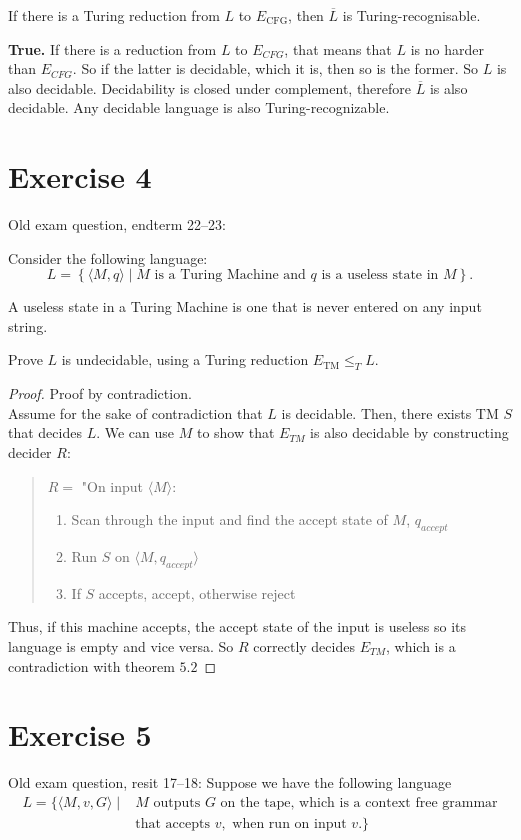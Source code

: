 \documentclass[a4paper,11pt]{article}
\newcommand{\set}[1]{\left\{ #1 \right\}}
\begin{document}
	If there is a Turing reduction from $L$ to $E_{\mathrm{CFG}}$, then $\overline{L}$ is Turing-recognisable.

	\textbf{True.} If there is a reduction from $L$ to $E_{CFG}$, that means that $L$ is no harder than $E_{CFG}$. So if the latter is decidable, which it is, then so is the former. So $L$ is also decidable. Decidability is closed under complement, therefore $\overline{L}$ is also decidable. Any decidable language is also Turing-recognizable.

	\section{Exercise 4}
	Old exam question, endterm 22--23:

	Consider the following language:
	\[
	L = \set{\langle M,q \rangle \mid M \text{ is a Turing Machine and } q \text{ is a useless state in } M }.
	\]

	A useless state in a Turing Machine is one that is never entered on any input string.

	Prove $L$ is undecidable, using a Turing reduction $E_{\mathrm{TM}} \leq_T L$.

	\begin{proof}
		Proof by contradiction.\\
		Assume for the sake of contradiction that $L$ is decidable. Then, there exists TM $S$ that decides $L$. We can use $M$ to show that $E_{TM}$ is also decidable by constructing decider $R$:
		\begin{quote}
			$R=$ "On input $\langle M\rangle$:
			\begin{enumerate}
				\item Scan through the input and find the accept state of $M$, $q_{accept}$
				\item Run $S$ on $\langle M,q_{accept}\rangle$
				\item If $S$ accepts, accept, otherwise reject
			\end{enumerate}
		\end{quote}
		Thus, if this machine accepts, the accept state of the input is useless so its language is empty and vice versa. So $R$ correctly decides $E_{TM}$, which is a contradiction with theorem $5.2$
	\end{proof}

	\section{Exercise 5}
	Old exam question, resit 17--18: Suppose we have the following language
	\begin{align*}
	L = \{\langle M,v,G \rangle \mid & M \text{ outputs } G \text{ on the tape, which is a context free grammar}\\
	&\text{that accepts } v,\text{ when run on input } v.\}
	\end{align*}
\end{document}
